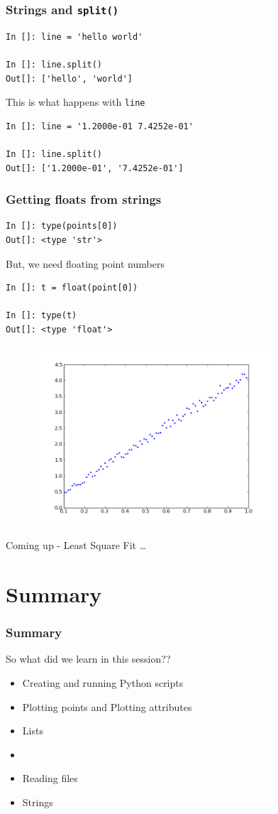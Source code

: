 \documentclass[14pt,compress]{beamer}
\newcommand{\typ}[1]{\lstinline{#1}}
\newcommand{\kwrd}[1]{ \texttt{\textbf{\color{blue}{#1}}}  }
\begin{document}
\begin{frame}[fragile]
\frametitle{Strings and \typ{split()}}
  \begin{lstlisting}
In []: line = 'hello world'

In []: line.split()
Out[]: ['hello', 'world']
  \end{lstlisting}
This is what happens with \typ{line}
  \begin{lstlisting}
In []: line = '1.2000e-01 7.4252e-01'

In []: line.split()
Out[]: ['1.2000e-01', '7.4252e-01']
  \end{lstlisting}
\end{frame}

\begin{frame}[fragile]
\frametitle{Getting floats from strings}
  \begin{lstlisting}
In []: type(points[0])
Out[]: <type 'str'>
  \end{lstlisting}
But, we need floating point numbers
  \begin{lstlisting}
In []: t = float(point[0])

In []: type(t)
Out[]: <type 'float'>
  \end{lstlisting}
\end{frame}

\begin{frame}[fragile]
\begin{figure}
\includegraphics[width=3.5in]{data/L-Tsq.png}
\end{figure}
\vspace{-0.2in}
Coming up - \alert{Least Square Fit \ldots}
\end{frame}

\section {Summary}
\begin{frame}
\frametitle{Summary}
So what did we learn in this session??
\begin{itemize}
  \item Creating and running Python scripts
  \item Plotting points and Plotting attributes
  \item Lists
  \item \kwrd{for}
  \item Reading files
  \item Strings
\end{itemize}
\end{frame}
\end{document}
